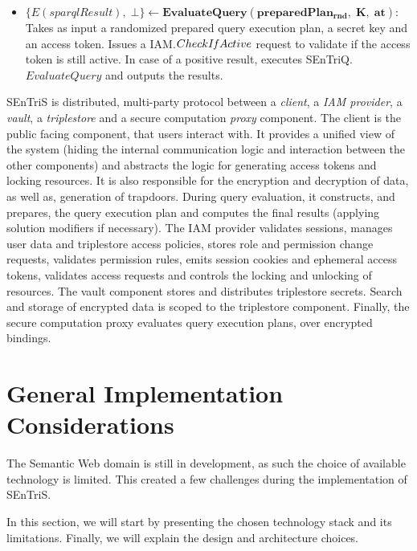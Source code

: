 \begin{definition}
\begin{itemize}
        \item $\{E(sparqlResult), \; \bot\} \leftarrow \mathbf{EvaluateQuery(preparedPlan_{rnd}, \; K, \; at)}$: Takes as input a randomized prepared query execution plan, a secret key and an access token. Issues a IAM.$CheckI\textrm{\emph{f}}Active$ request to validate if the access token is still active. In case of a positive result, executes SEnTriQ.$EvaluateQuery$ and outputs the results.
    \end{itemize}

    \gls{SEnTriS} is distributed, multi-party protocol between a \emph{client}, a \emph{IAM provider}, a \emph{vault}, a \emph{triplestore} and a secure computation \emph{proxy} component. The client is the public facing component, that users interact with. It provides a unified view of the system (hiding the internal communication logic and interaction between the other components) and abstracts the logic for generating access tokens and locking resources. It is also responsible for the encryption and decryption of data, as well as, generation of trapdoors. During query evaluation, it constructs, and prepares, the query execution plan and computes the final results (applying solution modifiers if necessary). The IAM provider validates sessions, manages user data and triplestore access policies, stores role and permission change requests, validates permission rules, emits session cookies and ephemeral access tokens, validates access requests and controls the locking and unlocking of resources. The vault component stores and distributes triplestore secrets. Search and storage of encrypted data is scoped to the triplestore component. Finally, the secure computation proxy evaluates query execution plans, over encrypted bindings.

\end{definition}

\pagebreak

\section{General Implementation Considerations}

The Semantic Web domain is still in development, as such the choice of available technology is limited. This created a few challenges during the implementation of \gls{SEnTriS}.

In this section, we will start by presenting the chosen technology stack and its limitations. Finally, we will explain the design and architecture choices.


